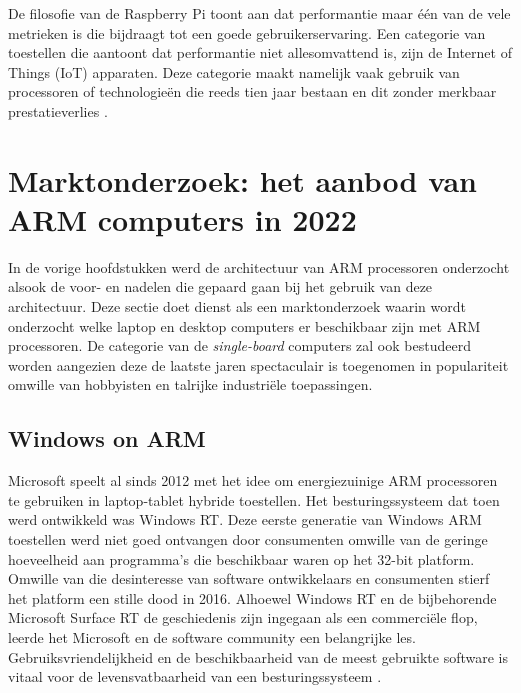 De filosofie van de Raspberry Pi toont aan dat performantie maar één van de vele metrieken is die bijdraagt tot een goede gebruikerservaring. Een categorie van toestellen die aantoont dat performantie niet allesomvattend is, zijn de Internet of Things (IoT) apparaten. Deze categorie maakt namelijk vaak gebruik van processoren of technologieën die reeds tien jaar bestaan en dit zonder merkbaar prestatieverlies \autocite{Aitken2019}. 

\section{Marktonderzoek: het aanbod van ARM computers in 2022}
In de vorige hoofdstukken werd de architectuur van ARM processoren onderzocht alsook de voor- en nadelen die gepaard gaan bij het gebruik van deze architectuur. Deze sectie doet dienst als een marktonderzoek waarin wordt onderzocht welke laptop en desktop computers er beschikbaar zijn met ARM processoren. De categorie van de \textit{single-board} computers zal ook bestudeerd worden aangezien deze de laatste jaren spectaculair is toegenomen in populariteit omwille van hobbyisten en talrijke industriële toepassingen.

\subsection{Windows on ARM}
Microsoft speelt al sinds 2012 met het idee om energiezuinige ARM processoren te gebruiken in laptop-tablet hybride toestellen. Het besturingssysteem dat toen werd ontwikkeld was Windows RT. Deze eerste generatie van Windows ARM toestellen werd niet goed ontvangen door consumenten omwille van de geringe hoeveelheid aan programma's die beschikbaar waren op het 32-bit platform. Omwille van die desinteresse van software ontwikkelaars en consumenten stierf het platform een stille dood in 2016. Alhoewel Windows RT en de bijbehorende Microsoft Surface RT de geschiedenis zijn ingegaan als een commerciële flop, leerde het Microsoft en de software community een belangrijke les. Gebruiksvriendelijkheid en de beschikbaarheid van de meest gebruikte software is vitaal voor de levensvatbaarheid van een besturingssysteem \autocite{Triggs2022}. 

